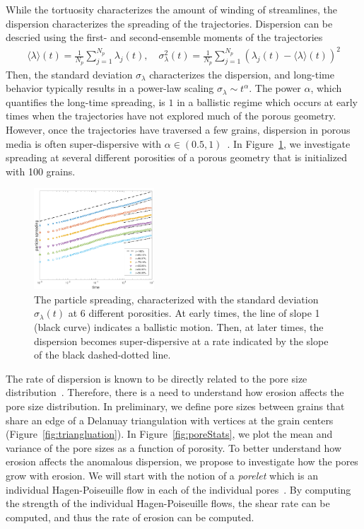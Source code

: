\documentclass[11pt]{article}
\begin{document}
While the tortuosity characterizes the amount of winding of streamlines,
the dispersion characterizes the spreading of the trajectories.
Dispersion can be descried using the first- and second-ensemble moments
of the trajectories
\begin{align}
  \langle \lambda \rangle (t) = \frac{1}{N_p} \sum_{j=1}^{N_p}
    \lambda_j(t), \quad \sigma_\lambda^{2}(t) = \frac{1}{N_p}
    \sum_{j=1}^{N_p} (\lambda_j(t) - \langle \lambda \rangle(t))^2
\end{align}
Then, the standard deviation $\sigma_\lambda$ characterizes the
dispersion, and long-time behavior typically results in a power-law
scaling $\sigma_\lambda \sim t^{\alpha}$. The power $\alpha$, which
quantifies the long-time spreading, is $1$ in a ballistic regime which
occurs at early times when the trajectories have not explored much of
the porous geometry. However, once the trajectories have traversed a few
grains, dispersion in porous media is often super-dispersive with
$\alpha \in (0.5,1)$~\cite{}. In Figure~\ref{fig:100dispersion}, we
investigate spreading at several different porosities of a porous
geometry that is initialized with 100 grains.
\begin{figure}
  \includegraphics[width=0.4\textwidth]{figs/100b_second_moment_long_ref}
  \caption{\label{fig:100dispersion} The particle spreading,
  characterized with the standard deviation $\sigma_\lambda(t)$ at 6
  different porosities. At early times, the line of slope 1 (black
  curve) indicates a ballistic motion. Then, at later times, the
  dispersion becomes super-dispersive at a rate indicated by the slope
  of the black dashed-dotted line.}
\end{figure}

The rate of dispersion is known to be directly related to the pore size
distribution~\cite{dea-qua-bir-jua2018}. Therefore, there is a need to
understand how erosion affects the pore size distribution. In
preliminary, we define pore sizes between grains that share an edge of a
Delanuay triangulation with vertices at the grain centers
(Figure~\ref{fig:triangluation}). In Figure~\ref{fig:poreStats}, we plot
the mean and variance of the pore sizes as a function of porosity. To
better understand how erosion affects the anomalous dispersion, we
propose to investigate how the pores grow with erosion. We will start
with the notion of a {\em porelet} which is an individual
Hagen-Poiseuille flow in each of the individual
pores~\cite{dea-qua-bib-jua2018}. By computing the strength of the
individual Hagen-Poiseuille flows, the shear rate can be computed, and
thus the rate of erosion can be computed. 
\end{document}
